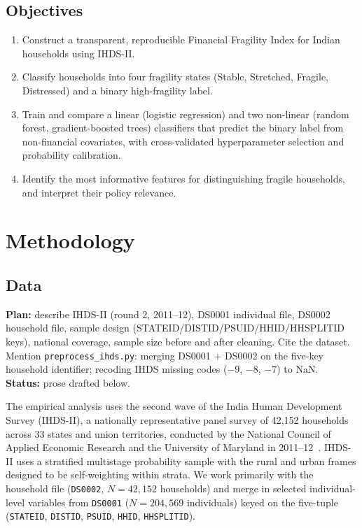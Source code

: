 \documentclass[colorlinks,balance]{asmeconf}
\begin{document}
\subsection{Objectives}
\begin{enumerate}
\item Construct a transparent, reproducible Financial Fragility Index for Indian households using IHDS-II.
\item Classify households into four fragility states (Stable, Stretched, Fragile, Distressed) and a binary high-fragility label.
\item Train and compare a linear (logistic regression) and two non-linear (random forest, gradient-boosted trees) classifiers that predict the binary label from non-financial covariates, with cross-validated hyperparameter selection and probability calibration.
\item Identify the most informative features for distinguishing fragile households, and interpret their policy relevance.
\end{enumerate}

\section{Methodology}

\subsection{Data}
\begin{outline}
\textbf{Plan:} describe IHDS-II (round 2, 2011--12), DS0001 individual file, DS0002 household file, sample design (STATEID/DISTID/PSUID/HHID/HHSPLITID keys), national coverage, sample size before and after cleaning. Cite the dataset.\\
Mention \texttt{preprocess\_ihds.py}: merging DS0001 + DS0002 on the five-key household identifier; recoding IHDS missing codes ($-9$, $-8$, $-7$) to NaN.\\
\textbf{Status:} prose drafted below.
\end{outline}
The empirical analysis uses the second wave of the India Human Development Survey (IHDS-II), a nationally representative panel survey of 42{,}152 households across 33 states and union territories, conducted by the National Council of Applied Economic Research and the University of Maryland in 2011--12~\cite{ihds2}. IHDS-II uses a stratified multistage probability sample with the rural and urban frames designed to be self-weighting within strata. We work primarily with the household file (\texttt{DS0002}, $N = 42{,}152$ households) and merge in selected individual-level variables from \texttt{DS0001} ($N = 204{,}569$ individuals) keyed on the five-tuple (\texttt{STATEID}, \texttt{DISTID}, \texttt{PSUID}, \texttt{HHID}, \texttt{HHSPLITID}).
\end{document}
